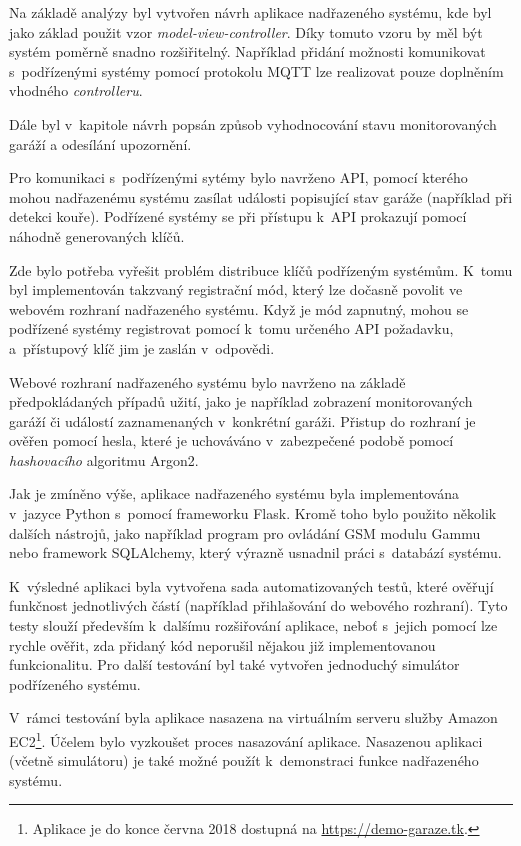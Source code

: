 Na základě analýzy byl vytvořen návrh aplikace nadřazeného systému, kde byl jako základ použit vzor \textit{model-view-controller}. Díky tomuto vzoru by měl být systém poměrně snadno rozšiřitelný. Například přidání možnosti komunikovat s~podřízenými systémy pomocí protokolu MQTT lze realizovat pouze doplněním vhodného \textit{controlleru}.

Dále byl v~kapitole návrh popsán způsob vyhodnocování stavu monitorovaných garáží a odesílání upozornění.

Pro komunikaci s~podřízenými sytémy bylo navrženo API, pomocí kterého mohou nadřazenému systému zasílat události popisující stav garáže (například při detekci kouře). Podřízené systémy se při přístupu k~API prokazují pomocí náhodně generovaných klíčů.

Zde bylo potřeba vyřešit problém distribuce klíčů podřízeným systémům. K~tomu byl implementován takzvaný registrační mód, který lze dočasně povolit ve webovém rozhraní nadřazeného systému. Když je mód zapnutný, mohou se podřízené systémy registrovat pomocí k~tomu určeného API požadavku, a~přístupový klíč jim je zaslán v~odpovědi.

Webové rozhraní nadřazeného systému bylo navrženo na základě předpokládaných případů užití, jako je například zobrazení monitorovaných garáží či událostí zaznamenaných v~konkrétní garáži. Přistup do rozhraní je ověřen pomocí hesla, které je uchováváno v~zabezpečené podobě pomocí \textit{hashovacího} algoritmu Argon2.

Jak je zmíněno výše, aplikace nadřazeného systému byla implementována v~jazyce Python s~pomocí frameworku Flask. Kromě toho bylo použito několik dalších nástrojů, jako například program pro ovládání GSM modulu Gammu nebo framework SQLAlchemy, který výrazně usnadnil práci s~databází systému.


K~výsledné aplikaci byla vytvořena sada automatizovaných testů, které ověřují funkčnost jednotlivých částí (například přihlašování do webového rozhraní). Tyto testy slouží především k~dalšímu rozšiřování aplikace, neboť s~jejich pomocí lze rychle ověřit, zda přidaný kód neporušil nějakou již implementovanou funkcionalitu. Pro další testování byl také vytvořen jednoduchý simulátor podřízeného systému.

V~rámci testování byla aplikace nasazena na virtuálním serveru služby Amazon EC2\footnote{Aplikace je do konce června 2018 dostupná na \url{https://demo-garaze.tk}.}. Účelem bylo vyzkoušet proces nasazování aplikace. Nasazenou aplikaci (včetně simulátoru) je také možné použít k~demonstraci funkce nadřazeného systému.

